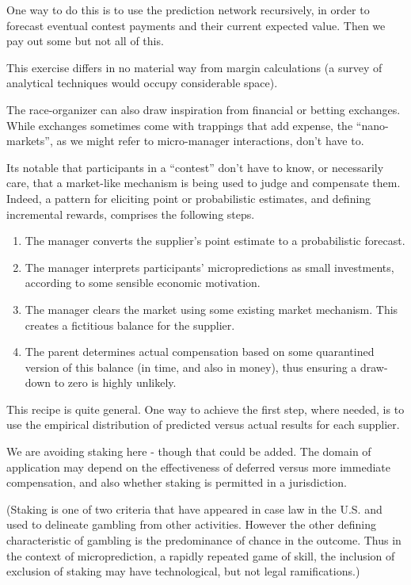 One way to do this is to use the prediction network recursively, in order to forecast eventual contest payments and their current expected value. Then we pay out some but not all of this. 

This exercise differs in no material way from margin calculations (a survey of analytical techniques would occupy considerable space). 

The race-organizer can also draw inspiration from financial or betting exchanges. While exchanges sometimes come with trappings that add expense, the ``nano-markets'', as we might refer to micro-manager interactions, don't have to. 

Its notable that participants in a ``contest'' don't have to know, or necessarily care, that a market-like mechanism is being used to judge and compensate them. Indeed, a pattern for eliciting point or probabilistic estimates, and defining incremental rewards, comprises the following steps.
\begin{enumerate}
\item The manager converts the supplier's point estimate to a probabilistic forecast.  
\item The manager interprets participants' micropredictions as small investments, according to some sensible economic motivation. 
\item The manager clears the market using some existing market mechanism. This creates a fictitious balance for the supplier. 
\item The parent determines actual compensation based on some quarantined version of this balance (in time, and also in money), thus ensuring a draw-down to zero is highly unlikely.
\end{enumerate}
This recipe is quite general. One way to achieve the first step, where needed, is to use the empirical distribution of predicted versus actual results for each supplier. 

We are avoiding staking here - though that could be added. The domain of application may depend on the effectiveness of deferred versus more immediate compensation, and also whether staking is permitted in a jurisdiction.

(Staking is one of two criteria that have appeared in case law in the U.S. and used to delineate gambling from other activities. However the other defining characteristic of gambling is the predominance of chance in the outcome. Thus in the context of microprediction, a rapidly repeated game of skill, the inclusion of exclusion of staking may have technological, but not legal ramifications.) 

